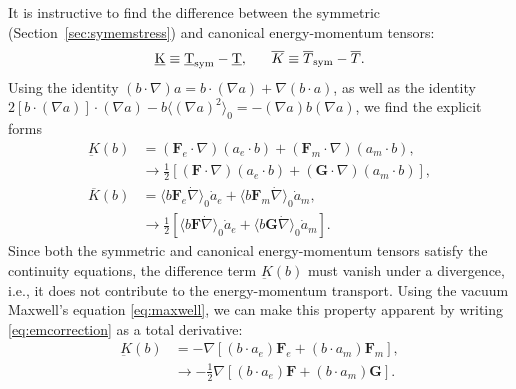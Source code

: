 \documentclass[1p,sort&compress]{elsarticle}
\numberwithin{equation}{section}
\newcommand{\bv}[1]{\mathbf{#1}}
\newcommand{\mean}[1]{\langle #1 \rangle}
\begin{document}
It is instructive to find the difference between the symmetric (Section~\ref{sec:symemstress}) and canonical energy-momentum tensors:
\begin{align}
  \underbar{K} \equiv \underbar{T}_{\rm sym}-\underbar{T}, ~~~~~ \overline{K} \equiv \overline{T}_{\rm sym}-\overline{T}.
\end{align}
Using the identity $(b\cdot\nabla)a = b\cdot(\nabla a) + \nabla(b\cdot a)$, as well as the identity $2[b \cdot (\nabla a)]\cdot(\nabla a) - b\mean{(\nabla a)^2}_0 = -(\nabla a)b(\nabla a)$, we find the explicit forms
\begin{align}
  \label{eq:emcorrection}
  \underbar{K}(b) &= (\bv{F}_e\cdot\nabla)(a_e\cdot b) + (\bv{F}_m\cdot\nabla)(a_m\cdot b), \\
  &\to \frac{1}{2}[(\bv{F}\cdot\nabla)(a_e\cdot b) + (\bv{G}\cdot\nabla)(a_m\cdot b)], \nonumber \\
  \label{eq:emcorrectionadjoint}
  \overline{K}(b) &= \mean{b\bv{F}_e\dot{\nabla}}_0\dot{a}_e + \mean{b\bv{F}_m\dot{\nabla}}_0\dot{a}_m, \\
  &\to \frac{1}{2}\left[\mean{b\bv{F}\dot{\nabla}}_0\dot{a}_e + \mean{b\bv{G}\dot{\nabla}}_0\dot{a}_m\right]. \nonumber 
\end{align}
Since both the symmetric and canonical energy-momentum tensors satisfy the continuity equations, the difference term $\underbar{K}(b)$ must vanish under a divergence, i.e., it does not contribute to the energy-momentum transport. Using the vacuum Maxwell's equation \eqref{eq:maxwell}, we can make this property apparent by writing \eqref{eq:emcorrection} as a total derivative:
 \begin{align}
  \underbar{K}(b) &= -\nabla[(b\cdot a_e)\bv{F}_e + (b\cdot a_m)\bv{F}_m], \\
  &\to -\frac{1}{2}\nabla[(b\cdot a_e)\bv{F} + (b\cdot a_m)\bv{G}]. \nonumber
\end{align}
\end{document}
